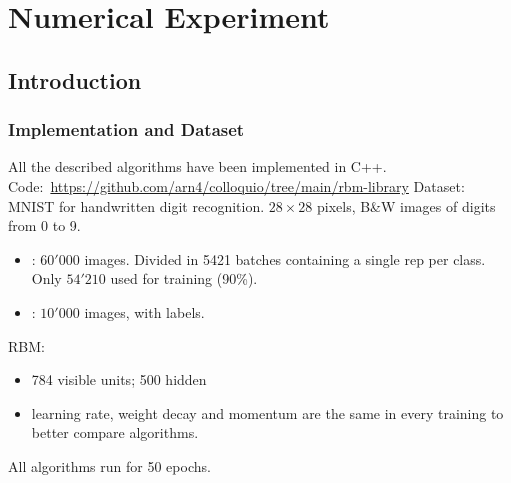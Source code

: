 
\section{Numerical Experiment}
\subsection{Introduction}
\begin{frame}
  \frametitle{Implementation and Dataset}
  All the described algorithms have been implemented in \alert{C++}.
  {\small Code:~\url{https://github.com/arn4/colloquio/tree/main/rbm-library}}
  \vspace{10pt}
  \pause
  Dataset: \alert{MNIST} for handwritten digit recognition. \(28\times28\) pixels, B\&W images of digits from 0 to 9.
  \begin{itemize}
    \item {}: \(60'000\) images. 
          Divided in 5421 batches containing a single rep per class.
          Only \(54'210\) used for training (90\%).
    \item {}: \(10'000\) images, with labels.
  \end{itemize}
  \vspace{10pt}
  \pause
  RBM:
  \begin{itemize}
    \item 784 visible units; 500 hidden
    \item learning rate, weight decay and momentum are the same in every training to better compare algorithms.
  \end{itemize}
  All algorithms run for 50 epochs.
\end{frame}


